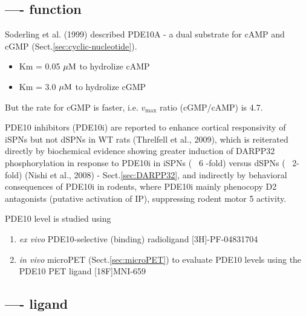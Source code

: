 


%

\subsection{---- function}
\label{sec:PDE10-function}

Soderling et al. (1999) described PDE10A - a dual substrate for cAMP and cGMP
(Sect.\ref{sec:cyclic-nucleotide}).
\begin{itemize}
  \item Km = 0.05 ${\mu\text{M}}$ to hydrolize cAMP
  
  \item Km = 3.0 ${\mu\text{M}}$ to hydrolize cGMP
\end{itemize}
But the rate for cGMP is faster, i.e. $v_\max$ ratio (cGMP/cAMP) is 4.7.

PDE10 inhibitors (PDE10i) are reported to enhance cortical responsivity of iSPNs
but not dSPNs in WT rats (Threlfell et al., 2009), which is reiterated directly
by biochemical evidence showing greater induction of DARPP32 phosphorylation in
response to PDE10i in iSPNs (~ 6 -fold) versus dSPNs (~ 2-fold) (Nishi et al.,
2008) - Sect.\ref{sec:DARPP32}, and indirectly by behavioral consequences of
PDE10i in rodents, where PDE10i mainly phenocopy D2 antagonists (putative
activation of IP), suppressing rodent motor 5 activity.

PDE10 level is studied using
\begin{enumerate}
  \item {\it ex vivo} PDE10-selective (binding) radioligand [3H]-PF-04831704
  
  \item   {\it in vivo} microPET (Sect.\ref{sec:microPET}) to evaluate PDE10
  levels using the PDE10 PET ligand [18F]MNI-659
\end{enumerate}


\subsection{---- ligand}
\label{sec:PDE10-ligand}


